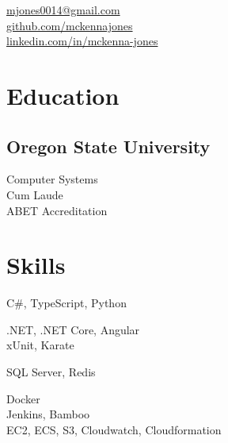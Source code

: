 \documentclass[]{hieudo-build}
\begin{document}
%
%
{
	\faEnvelope \href{mailto:mjones0014@gmail.com}{  mjones0014@gmail.com}\\
	\faGithub \href{https://github.com/mckennajones}{  github.com/mckennajones}\\
	\faLinkedinSquare \href{https://www.linkedin.com/in/mckenna-jones}{  linkedin.com/in/mckenna-jones}
}
    
%
%
\begin{minipage}[t]{0.25\textwidth} 

\section{Education} 

\subsection{Oregon State University}
Computer Systems \\
Cum Laude\\
ABET Accreditation \\

\vspace{20pt}
\section{Skills}
C\#, TypeScript, Python
\sectionsep

.NET, .NET Core, Angular\\
xUnit, Karate
\sectionsep

SQL Server, Redis\\
\sectionsep

Docker\\
Jenkins, Bamboo\\
EC2, ECS, S3, Cloudwatch, Cloudformation
\sectionsep


\end{minipage}
\end{document}
